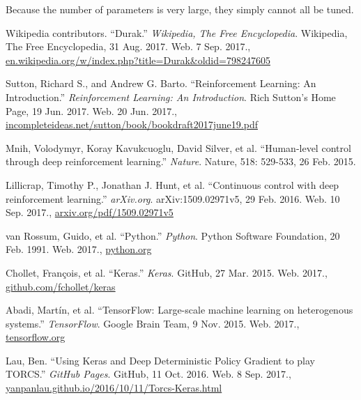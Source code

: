 \documentclass[a4paper,titlepage]{article}
\begin{document}
Because the number of parameters is very large, they simply cannot all be tuned.

\newpage

\begin{thebibliography}{9}

  Wikipedia contributors. ``Durak.'' \emph{Wikipedia, The Free Encyclopedia}. Wikipedia, The Free Encyclopedia, 31 Aug. 2017. Web.
  7 Sep. 2017., \\
  \url{en.wikipedia.org/w/index.php?title=Durak&oldid=798247605}

  Sutton, Richard S., and Andrew G. Barto. ``Reinforcement Learning: An Introduction.'' \emph{Reinforcement Learning: An Introduction}. Rich Sutton's Home Page, 19 Jun. 2017. Web.
  20 Jun. 2017., \\
  \url{incompleteideas.net/sutton/book/bookdraft2017june19.pdf}

  Mnih, Volodymyr, Koray Kavukcuoglu, David Silver, et al. ``Human-level control through deep reinforcement learning.'' \emph{Nature}. Nature, 518: 529-533, 26 Feb. 2015.

  Lillicrap, Timothy P., Jonathan J. Hunt, et al. ``Continuous control with deep reinforcement learning.'' \emph{arXiv.org}. arXiv:1509.02971v5, 29 Feb. 2016. Web.
  10 Sep. 2017.,
  \url{arxiv.org/pdf/1509.02971v5}

  van Rossum, Guido, et al. ``Python.'' \emph{Python}. Python Software Foundation, 20 Feb. 1991. Web.
  2017.,
  \url{python.org}

  Chollet, Fran\c{c}ois, et al. ``Keras.'' \emph{Keras}. GitHub, 27 Mar. 2015. Web.
  2017.,
  \url{github.com/fchollet/keras}

  Abadi, Martín, et al. ``TensorFlow: Large-scale machine learning on heterogenous systems.'' \emph{TensorFlow}. Google Brain Team, 9 Nov. 2015. Web.
  2017.,
  \url{tensorflow.org}

  Lau, Ben. ``Using Keras and Deep Deterministic Policy Gradient to play TORCS.'' \emph{GitHub Pages}. GitHub, 11 Oct. 2016. Web.
  8 Sep. 2017., \\
  \url{yanpanlau.github.io/2016/10/11/Torcs-Keras.html}

\end{thebibliography}
\end{document}
